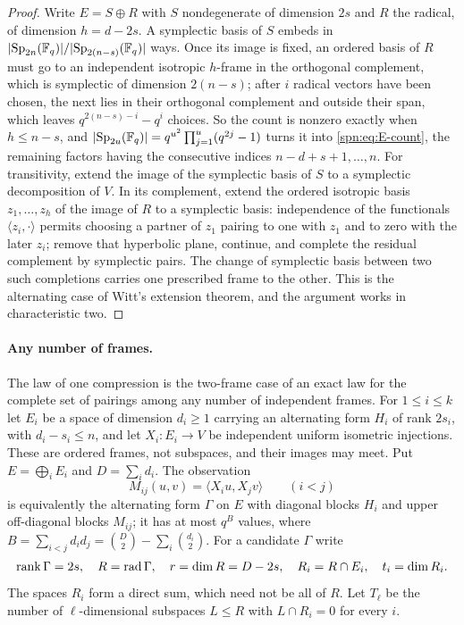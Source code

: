 \begin{proof}
Write $E=S\oplus R$ with $S$ nondegenerate of dimension $2s$ and $R$ the
radical, of dimension $h=d-2s$. A symplectic basis of $S$ embeds in
$\lvert\operatorname{Sp}_{2n}(\mathbb{F}_q)\rvert/\lvert\operatorname{Sp}_{2(n-s)}(\mathbb{F}_q)\rvert$ ways. Once its image is fixed,
an ordered basis of $R$ must go to an independent isotropic $h$-frame in the
orthogonal complement, which is symplectic of dimension $2(n-s)$; after $i$
radical vectors have been chosen, the next lies in their orthogonal complement
and outside their span, which leaves $q^{2(n-s)-i}-q^i$ choices. So the count is
nonzero exactly when $h\le n-s$, and
$\lvert\operatorname{Sp}_{2u}(\mathbb{F}_q)\rvert=q^{u^2}\prod_{j=1}^u(q^{2j}-1)$ turns it into
\eqref{spn:eq:E-count}, the remaining factors having the consecutive indices
$n-d+s+1,\dots,n$. For transitivity, extend the image of the symplectic basis
of $S$ to a symplectic decomposition of $V$. In its complement, extend the
ordered isotropic basis $z_1,\dots,z_h$ of the image of $R$ to a symplectic
basis: independence of the functionals $\langle z_i,\cdot\rangle$ permits
choosing a partner of $z_1$ pairing to one with $z_1$ and to zero with the
later $z_i$; remove that hyperbolic plane, continue, and complete the residual
complement by symplectic pairs. The change of symplectic basis between two
such completions carries one prescribed frame to the other. This is the
alternating case of Witt's extension theorem, and the argument works in
characteristic two.
\end{proof}

\paragraph{Any number of frames.}
The law of one compression is the two-frame case of an exact law for the complete set of pairings
among any number of independent frames. For $1\le i\le k$ let $E_i$ be a space of dimension
$d_i\ge1$ carrying an alternating form $H_i$ of rank $2s_i$, with $d_i-s_i\le n$, and let
$X_i\colon E_i\to V$ be independent uniform isometric injections. These are ordered frames, not
subspaces, and their images may meet. Put $E=\bigoplus_iE_i$ and $D=\sum_id_i$. The observation
\[
 M_{ij}(u,v)=\langle X_iu,X_jv\rangle\qquad(i<j)
\]
is equivalently the alternating form $\Gamma$ on $E$ with diagonal blocks $H_i$ and upper
off-diagonal blocks $M_{ij}$; it has at most $q^B$ values, where
$B=\sum_{i<j}d_id_j=\binom D2-\sum_i\binom{d_i}2$. For a candidate $\Gamma$ write
\[
 \operatorname{rank}\Gamma=2s,\quad R=\operatorname{rad}\Gamma,\quad r=\dim R=D-2s,\quad R_i=R\cap E_i,\quad
 t_i=\dim R_i .
\]
The spaces $R_i$ form a direct sum, which need not be all of $R$. Let $T_\ell$ be the number of
$\ell$-dimensional subspaces $L\le R$ with $L\cap R_i=0$ for every $i$.

